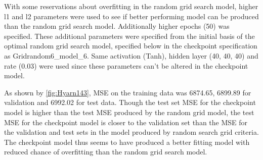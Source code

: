 \documentclass[12pt,twoside]{amherstthesis}
\begin{document}
  With some reservations about overfitting in the random grid search
  model, higher l1 and l2 parameters were used to see if better performing
  model can be produced than the random grid search model. Additionally
  higher epochs (50) was specified. These additional parameters were
  specified from the initial basis of the optimal random grid search
  model, specified below in the checkpoint specification as
  Gridrandom6\_model\_6. Same activation (Tanh), hidden layer (40, 40, 40)
  and rate (0.03) were used since these parameters can't be altered in the
  checkpoint model.
  
  \begin{Shaded}
  \begin{Highlighting}[]
  \StringTok{ } 
  \StringTok{ }\NormalTok{(}
    \NormalTok{, }
    \NormalTok{,}
    \NormalTok{, }
    \NormalTok{,}
    \NormalTok{(}\NormalTok{, }\NormalTok{, }\NormalTok{),          }
    \NormalTok{,     }
    \NormalTok{,       }
    \NormalTok{,}
    \NormalTok{,         }
    \NormalTok{,                        }
    \NormalTok{,}
    \NormalTok{,}
     \NormalTok{,}
  \NormalTok{) }
  \end{Highlighting}
  \end{Shaded}
  
  As shown by \autoref{fig:Hyarn143}, MSE on the training data was
  6874.65, 6899.89 for validation and 6992.02 for test data. Though the
  test set MSE for the checkpoint model is higher than the test MSE
  produced by the random grid model, the test MSE for the checkpoint model
  is closer to the validation set than the MSE for the validation and test
  sets in the model produced by random search grid criteria. The
  checkpoint model thus seems to have produced a better fitting model with
  reduced chance of overfitting than the random grid search model.
  
\end{document}
